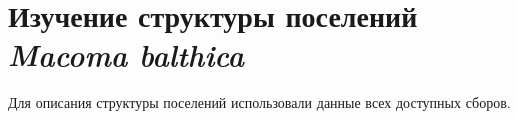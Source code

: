 





\afterpage{\clearpage}	

	\section{Изучение структуры поселений {\it Macoma balthica}}
Для описания структуры поселений использовали данные всех доступных сборов.

